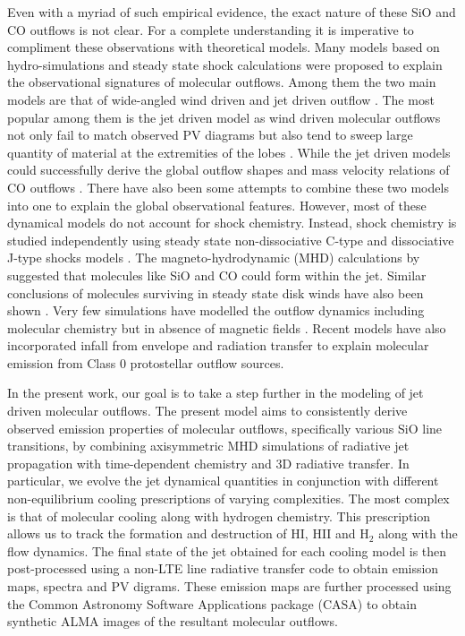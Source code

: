 \documentclass[useAMS,usenatbib]{mn2e}
\begin{document}
Even with a myriad of such empirical evidence, the exact nature of
these SiO and CO outflows is not clear. For a complete understanding it is imperative
to compliment these observations with theoretical models. Many models
based on hydro-simulations and steady state shock calculations
were proposed to explain the observational signatures of molecular
outflows. Among them the two main models are that of wide-angled wind
driven \cite{Shu:1991p14071} and jet driven outflow
\cite{Canto:1991p14123}. 
The most popular among them is the jet driven model as wind
driven molecular outflows not only fail to match observed PV diagrams \cite{Cabrit:1992p14098}
but also tend to sweep large quantity of material at the extremities
of the lobes \cite{Masson:1992p14101}. While the jet driven models could successfully
derive the global outflow shapes and mass velocity relations of CO
outflows \citep{Raga:1993p9948, Masson:1993p9661} . There have also been some attempts to combine these two
models into one \cite{Shang:2006p14268} to explain the global observational features. 
However, most of these dynamical models do not
account for shock chemistry. Instead, shock chemistry is studied
independently using steady state non-dissociative C-type and
dissociative J-type shocks models \citep{Neufeld:1989p11689, Schilke:1997p14140,Flower:2003p11236}. 
The magneto-hydrodynamic (MHD) calculations by \cite{Glassgold:1991p13703} suggested that molecules
like SiO and CO could form within the jet. Similar conclusions of
molecules surviving in steady state disk winds have also been shown
\cite{Panoglou:2012p10039}. 
Very few simulations have modelled the outflow
dynamics including molecular chemistry but in absence of
magnetic fields \citep{Raga:1995p12965, Smith:2003p9985}. 
Recent models have also incorporated
infall from envelope \citep{Rawlings:2013p14920} and radiation
transfer \citep{Offner:2011p14861} to explain molecular 
emission from Class 0 protostellar outflow sources. 



%
In the present work, our goal is to take a step further in the modeling of
jet driven molecular outflows. The present model aims to consistently derive observed emission properties of molecular outflows, specifically various SiO line
transitions, by combining axisymmetric MHD simulations of
radiative jet propagation with time-dependent chemistry and 3D radiative
transfer. In particular, we evolve the jet dynamical
quantities in conjunction with different non-equilibrium cooling
prescriptions of varying complexities. The most complex is that of
molecular cooling along with hydrogen chemistry. This prescription
allows us to track the formation and destruction of 
HI, HII and H$_{2}$ along with the flow dynamics. 
The final state of the jet obtained for each cooling model is then
post-processed using a non-LTE line radiative transfer code
to obtain emission maps, spectra and PV digrams. These emission maps
are further processed using the Common Astronomy Software Applications
package (CASA) to obtain synthetic ALMA images of the resultant molecular outflows.
%
\end{document}
